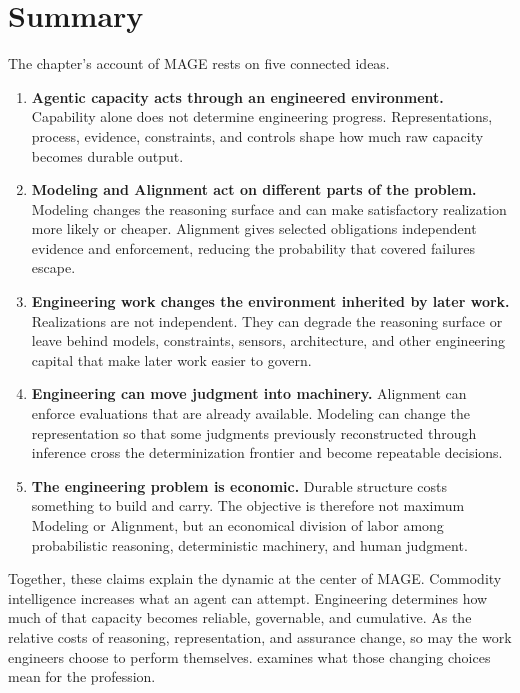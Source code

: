 



\chapter{Summary}

The chapter's account of MAGE rests on five connected ideas.

\begin{enumerate}
\def\labelenumi{\arabic{enumi}.}
\tightlist
\item
  \textbf{Agentic capacity acts through an engineered environment.} Capability alone does not determine engineering progress. Representations, process, evidence, constraints, and controls shape how much raw capacity becomes durable output.
\item
  \textbf{Modeling and Alignment act on different parts of the problem.} Modeling changes the reasoning surface and can make satisfactory realization more likely or cheaper. Alignment gives selected obligations independent evidence and enforcement, reducing the probability that covered failures escape.
\item
  \textbf{Engineering work changes the environment inherited by later work.} Realizations are not independent. They can degrade the reasoning surface or leave behind models, constraints, sensors, architecture, and other engineering capital that make later work easier to govern.
\item
  \textbf{Engineering can move judgment into machinery.} Alignment can enforce evaluations that are already available. Modeling can change the representation so that some judgments previously reconstructed through inference cross the determinization frontier and become repeatable decisions.
\item
  \textbf{The engineering problem is economic.} Durable structure costs something to build and carry. The objective is therefore not maximum Modeling or Alignment, but an economical division of labor among probabilistic reasoning, deterministic machinery, and human judgment.
\end{enumerate}

Together, these claims explain the dynamic at the center of MAGE. Commodity intelligence increases what an agent can attempt. Engineering determines how much of that capacity becomes reliable, governable, and cumulative. As the relative costs of reasoning, representation, and assurance change, so may the work engineers choose to perform themselves.  examines what those changing choices mean for the profession.
